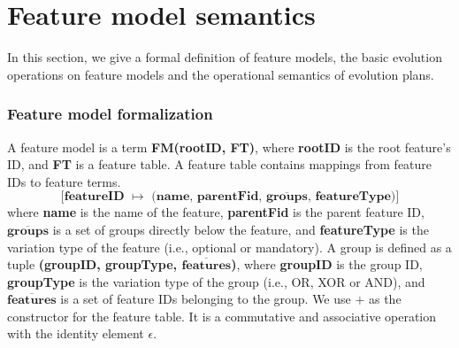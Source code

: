 \documentclass[a4paper,english]{ifimaster}
\begin{document}
\section{Feature model semantics}%
\label{sec:feature-model-semantics}

In this section, we give a formal definition of feature models, the basic evolution operations on feature models and the operational semantics of evolution plans.

\subsubsection*{Feature model formalization}
\label{def:feature-model}
A feature model is a term \textbf{FM(rootID, FT)}, where \textbf{rootID} is the root feature's ID, and
\textbf{FT} is a feature table. A feature table contains mappings from feature IDs to feature terms. 
$$
\textbf{[featureID $\mapsto$ (name, parentFid, $\overline{\textbf{groups}}$, featureType)]}
$$
where \textbf{name} is the name of the feature, \textbf{parentFid} is the parent feature ID, \textbf{$\overline{\textbf{groups}}$} is a set of groups directly below the feature, and \textbf{featureType} is the variation type of the feature (i.e., optional or mandatory). 
A group is defined as a tuple \textbf{(groupID, groupType, $\overline{\textbf{features}}$)}, where \textbf{groupID} is the group ID, \textbf{groupType} is the variation type of the group (i.e., OR, XOR or AND), and \textbf{$\overline{\textbf{features}}$} is a set of feature IDs belonging to the group. 
%
We use + as the constructor for the feature table. It is a commutative and associative operation with the identity element $\epsilon$.
\end{document}
